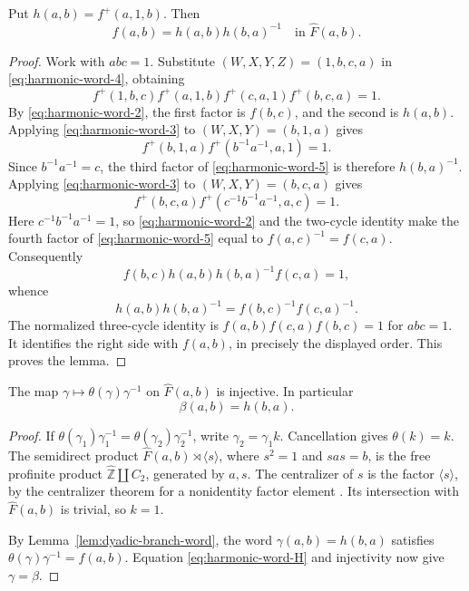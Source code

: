 \begin{lemma}\label{lem:dyadic-branch-word}
Put $h(a,b)=f^+(a,1,b)$.  Then
\[
 f(a,b)=h(a,b)h(b,a)^{-1}
 \quad\text{in }\widehat F(a,b).
\]
\end{lemma}
\begin{proof}
Work with $abc=1$.  Substitute $(W,X,Y,Z)=(1,b,c,a)$ in
\eqref{eq:harmonic-word-4}, obtaining
\begin{equation}\label{eq:harmonic-word-5}
f^+(1,b,c)f^+(a,1,b)f^+(c,a,1)f^+(b,c,a)=1.
\end{equation}
By \eqref{eq:harmonic-word-2}, the first factor is $f(b,c)$, and the second is
$h(a,b)$.  Applying \eqref{eq:harmonic-word-3} to $(W,X,Y)=(b,1,a)$ gives
\[
 f^+(b,1,a)f^+(b^{-1}a^{-1},a,1)=1.
\]
Since $b^{-1}a^{-1}=c$, the third factor of \eqref{eq:harmonic-word-5} is therefore
$h(b,a)^{-1}$.
Applying \eqref{eq:harmonic-word-3} to $(W,X,Y)=(b,c,a)$ gives
\[
 f^+(b,c,a)f^+(c^{-1}b^{-1}a^{-1},a,c)=1.
\]
Here $c^{-1}b^{-1}a^{-1}=1$, so \eqref{eq:harmonic-word-2} and the two-cycle
identity make the fourth factor of \eqref{eq:harmonic-word-5} equal to
$f(a,c)^{-1}=f(c,a)$.
Consequently
\[
 f(b,c)h(a,b)h(b,a)^{-1}f(c,a)=1,
\]
whence
\[
 h(a,b)h(b,a)^{-1}=f(b,c)^{-1}f(c,a)^{-1}.
\]
The normalized three-cycle identity is
$f(a,b)f(c,a)f(b,c)=1$ for $abc=1$.
It identifies the right side with $f(a,b)$, in precisely
the displayed order.  This proves the lemma.
\end{proof}

\begin{lemma}\label{lem:unique-swap-frame}
The map $\gamma\mapsto\theta(\gamma)\gamma^{-1}$ on
$\widehat F(a,b)$ is injective.  In particular
\[
 \beta(a,b)=h(b,a).
\]
\end{lemma}
\begin{proof}
If $\theta(\gamma_1)\gamma_1^{-1}=
\theta(\gamma_2)\gamma_2^{-1}$, write
$\gamma_2=\gamma_1 k$.  Cancellation gives $\theta(k)=k$.
The semidirect product
$\widehat F(a,b)\rtimes\langle s\rangle$, where $s^2=1$
and $sas=b$, is the free profinite product
$\widehat{\mathbb Z}\amalg C_2$, generated by $a,s$.
The centralizer of $s$ is the factor $\langle s\rangle$,
by the centralizer theorem for a nonidentity factor element
\cite[Theorem~B, p.~155]{HerfortRibes1985}.
Its intersection with $\widehat F(a,b)$ is trivial, so $k=1$.

By Lemma~\ref{lem:dyadic-branch-word}, the word
$\gamma(a,b)=h(b,a)$ satisfies
$\theta(\gamma)\gamma^{-1}=f(a,b)$.
Equation \eqref{eq:harmonic-word-H} and injectivity now give $\gamma=\beta$.
\end{proof}


